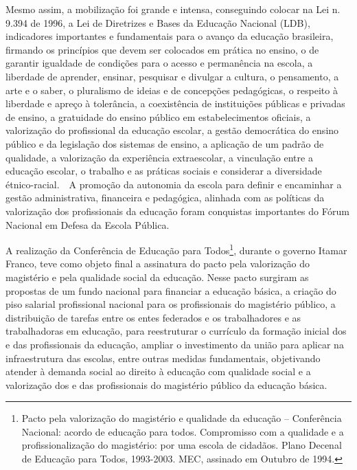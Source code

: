 Mesmo assim, a mobilização foi grande e intensa, conseguindo colocar na
Lei n. 9.394 de 1996, a Lei de Diretrizes e Bases da Educação Nacional
(LDB), indicadores importantes e fundamentais para o avanço da educação
brasileira, firmando os princípios que devem ser colocados em prática no
ensino, o de garantir\protect\hypertarget{art3i}{}{} igualdade de
condições para o acesso e permanência na escola,
\protect\hypertarget{art3ii}{}{}a liberdade de aprender, ensinar,
pesquisar e divulgar a cultura, o pensamento, a arte e o saber,
\protect\hypertarget{art3iii}{}{}o pluralismo de ideias e de concepções
pedagógicas, \protect\hypertarget{art3iv}{}{}o respeito à liberdade e
apreço à tolerância, \protect\hypertarget{art3v}{}{}a coexistência de
instituições públicas e privadas de
ensino,\protect\hypertarget{art3vi}{}{} a gratuidade do ensino público
em estabelecimentos oficiais, \protect\hypertarget{art3vii}{}{}a
valorização do profissional da educação
escolar\protect\hypertarget{art3viii}{}{}, a gestão democrática do
ensino público e da legislação dos sistemas de ensino,
\protect\hypertarget{art3ix}{}{}a aplicação de um padrão de qualidade,
\protect\hypertarget{art3x}{}{}a valorização da experiência
extraescolar, \protect\hypertarget{art3xi}{}{}a vinculação entre a
educação escolar, o trabalho e as práticas sociais
e\protect\hypertarget{art3xii}{}{} considerar a diversidade
étnico-racial.~~A promoção da autonomia da escola para definir e
encaminhar a gestão administrativa, financeira e pedagógica, alinhada
com as políticas da valorização dos profissionais da educação foram
conquistas importantes do Fórum Nacional em Defesa da Escola
Pública.~~~~

A realização da Conferência de Educação para Todos\footnote{Pacto pela
  valorização do magistério e qualidade da educação -- Conferência
  Nacional: acordo de educação para todos. Compromisso com a qualidade e
  a profissionalização do magistério: por uma escola de cidadãos. Plano
  Decenal de Educação para Todos, 1993-2003. MEC, assinado em Outubro de
  1994.}, durante o governo Itamar Franco, teve como objeto final a
assinatura do pacto pela valorização do magistério e pela qualidade
social da educação. Nesse pacto surgiram as propostas de um fundo
nacional para financiar a educação básica, a criação do piso salarial
profissional nacional para os profissionais do magistério público, a
distribuição de tarefas entre os entes federados e os trabalhadores e as
trabalhadoras em educação, para reestruturar o currículo da formação
inicial dos e das profissionais da educação, ampliar o investimento da
união para aplicar na infraestrutura das escolas, entre outras medidas
fundamentais, objetivando atender à demanda social ao direito à educação
com qualidade social e a valorização dos e das profissionais do
magistério público da educação básica.

